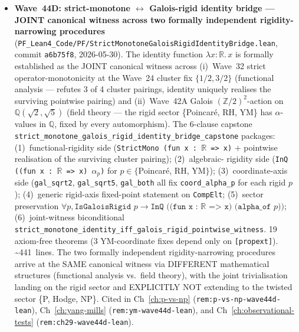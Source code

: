 \begin{itemize}
  the framework now exposes THREE LAYERS of citation surface:
  per-domain (Wave~22), per-arc (Wave~40D), and meta-architecture
  (Wave~44B). Cited in Ch~\ref{ch:observational-tests}
  (\texttt{rem:ch29-wave44b-lean}).
\item \textbf{Wave~44D: strict-monotone $\leftrightarrow$
  Galois-rigid identity bridge --- JOINT canonical witness across
  two formally independent rigidity-narrowing procedures}
  (\texttt{PF\_Lean4\_Code/PF/StrictMonotoneGaloisRigidIdentityBridge.lean},
  commit \texttt{a6b75f8}, 2026-05-30). The identity function
  $\lambda x : \mathbb{R}.\, x$ is formally established as the JOINT
  canonical witness across (i)~Wave~32 strict operator-monotonicity
  at the Wave~24 cluster fix $\{1/2, 3/2\}$ (functional analysis ---
  refutes 3 of 4 cluster pairings, identity uniquely realises the
  surviving pointwise pairing) and (ii)~Wave~42A Galois
  $(\mathbb{Z}/2)^2$-action on $\mathbb{Q}(\sqrt{2}, \sqrt{5})$
  (field theory --- the rigid sector \{Poincar\'e, RH, YM\} has
  $\alpha$-values in $\mathbb{Q}$, fixed by every automorphism).
  The 6-clause capstone
  \texttt{strict\_monotone\_galois\_rigid\_identity\_bridge\_capstone}
  packages: (1)~functional-rigidity side
  (\texttt{StrictMono (fun x : $\mathbb{R}$ => x)} $+$ pointwise
  realisation of the surviving cluster pairing); (2)~algebraic-
  rigidity side (\texttt{InQ ((fun x : $\mathbb{R}$ => x) $\alpha_p$)}
  for $p \in \{$Poincar\'e, RH, YM$\}$); (3)~coordinate-axis side
  (\texttt{gal\_sqrt2}, \texttt{gal\_sqrt5}, \texttt{gal\_both} all
  fix \texttt{coord\_alpha\_p} for each rigid $p$);
  (4)~generic rigid-axis fixed-point statement on \texttt{CompElt};
  (5)~sector preservation $\forall p, \texttt{IsGaloisRigid } p \to
  \texttt{InQ ((fun x : $\mathbb{R}$ => x) (alpha\_of } p))$;
  (6)~joint-witness biconditional
  \texttt{strict\_monotone\_identity\_iff\_galois\_rigid\_pointwise\_witness}.
  19 axiom-free theorems (3 YM-coordinate fixes depend only on
  \texttt{[propext]}). \textasciitilde 441~lines. The two
  formally independent rigidity-narrowing procedures arrive at the
  SAME canonical witness via DIFFERENT mathematical structures
  (functional analysis vs.\ field theory), with the joint
  trivialisation landing on the rigid sector and EXPLICITLY NOT
  extending to the twisted sector \{P, Hodge, NP\}. Cited in
  Ch~\ref{ch:p-vs-np} (\texttt{rem:p-vs-np-wave44d-lean}),
  Ch~\ref{ch:yang-mills} (\texttt{rem:ym-wave44d-lean}), and
  Ch~\ref{ch:observational-tests} (\texttt{rem:ch29-wave44d-lean}).
\end{itemize}

